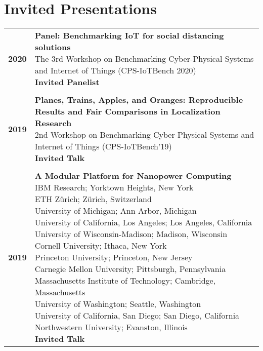 \documentclass{article}
\begin{document}
\renewcommand{\arraystretch}{1.0}



\section*{Invited Presentations}

\renewcommand{\arraystretch}{0.5}
\begin{longtable}{>{\bf}p{1cm} l}
  2020 & \makecell{
    \textbf{Panel: Benchmarking IoT for social distancing solutions} \\
    The 3rd Workshop on Benchmarking Cyber-Physical Systems and Internet of Things (CPS-IoTBench 2020) \\
    \textbf{\color{BrickRed} Invited Panelist} \\
  } \\

  \\

  2019 & \makecell{
    \textbf{Planes, Trains, Apples, and Oranges: Reproducible Results and Fair Comparisons in Localization Research} \\
    2nd Workshop on Benchmarking Cyber-Physical Systems and Internet of Things (CPS-IoTBench'19) \\
    \textbf{\color{BrickRed} Invited Talk} \\
  } \\

  \\

  2019 & \makecell{
    \textbf{A Modular Platform for Nanopower Computing} \\
    IBM Research; Yorktown Heights, New York \\
    ETH Z\"urich; Z\"urich, Switzerland \\
    University of Michigan; Ann Arbor, Michigan \\
    University of California, Los Angeles; Los Angeles, California \\
    University of Wisconsin-Madison; Madison, Wisconsin \\
    Cornell University; Ithaca, New York \\
    Princeton University; Princeton, New Jersey \\
    Carnegie Mellon University; Pittsburgh, Pennsylvania \\
    Massachusetts Institute of Technology; Cambridge, Massachusetts \\
    University of Washington; Seattle, Washington \\
    University of California, San Diego; San Diego, California \\
    Northwestern University; Evanston, Illinois \\
    \textbf{\color{BrickRed} Invited Talk} \\
  } \\


\end{longtable}
\end{document}

